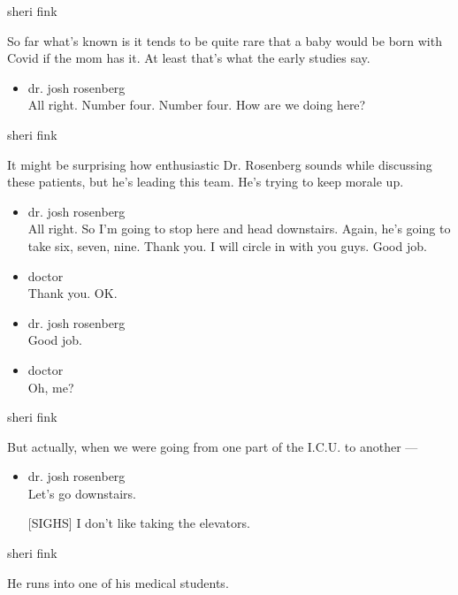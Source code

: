 sheri fink

So far what's known is it tends to be quite rare that a baby would be
born with Covid if the mom has it. At least that's what the early
studies say.

\begin{itemize}
\tightlist
\item
  dr. josh rosenberg\\
  All right. Number four. Number four. How are we doing here?
\end{itemize}

sheri fink

It might be surprising how enthusiastic Dr. Rosenberg sounds while
discussing these patients, but he's leading this team. He's trying to
keep morale up.

\begin{itemize}
\item
  dr. josh rosenberg\\
  All right. So I'm going to stop here and head downstairs. Again, he's
  going to take six, seven, nine. Thank you. I will circle in with you
  guys. Good job.
\item
  doctor\\
  Thank you. OK.
\item
  dr. josh rosenberg\\
  Good job.
\item
  doctor\\
  Oh, me?
\end{itemize}

sheri fink

But actually, when we were going from one part of the I.C.U. to another
---

\begin{itemize}
\item
  dr. josh rosenberg\\
  Let's go downstairs.

  {[}SIGHS{]} I don't like taking the elevators.
\end{itemize}

sheri fink

He runs into one of his medical students.

